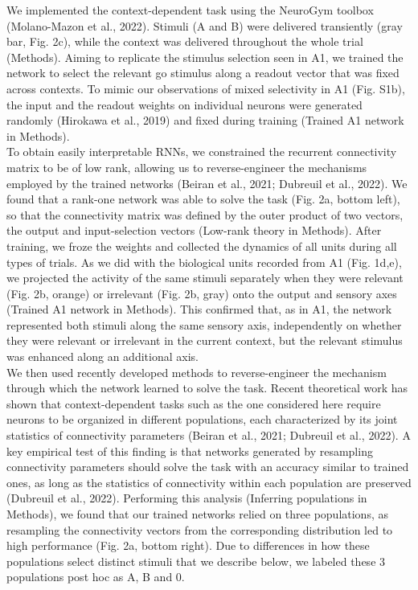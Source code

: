 \documentclass[12pt]{article}
\begin{document}
We implemented the context-dependent task using the NeuroGym toolbox (Molano-Mazon et al., 2022). Stimuli (A and B) were delivered transiently (gray bar, Fig. 2c), while the context was delivered throughout the whole trial (Methods). Aiming to replicate the stimulus selection seen in A1, we trained the network to select the relevant go stimulus along a readout vector that was fixed across contexts. To mimic our observations of mixed selectivity in A1 (Fig. S1b), the input and the readout weights on individual neurons were generated randomly (Hirokawa et al., 2019) and fixed during training (Trained  A1 network in Methods).  \\

To obtain easily interpretable RNNs, we constrained the recurrent connectivity matrix to be of low rank, allowing us to reverse-engineer the mechanisms employed by the trained networks (Beiran et al., 2021; Dubreuil et al., 2022). We found that a rank-one network was able to solve the task (Fig. 2a, bottom left), so that the connectivity matrix was defined by the outer product of two vectors, the output and input-selection vectors (Low-rank theory in Methods). After training, we froze the weights and collected the dynamics of all units during all types of trials. As we did with the biological units recorded from A1 (Fig. 1d,e), we projected the activity of the same stimuli separately when they were relevant (Fig. 2b, orange) or irrelevant (Fig. 2b, gray) onto the output and sensory axes (Trained  A1 network in Methods). This confirmed that, as in A1, the network represented both stimuli along the same sensory axis, independently on whether they were relevant or irrelevant in the current context, but the relevant stimulus was enhanced along an additional axis. \\

We then used recently developed methods to reverse-engineer the mechanism through which the network learned to solve the task. Recent theoretical work has shown that context-dependent tasks such as the one considered here require neurons to be organized in different populations, each characterized by its joint statistics of connectivity parameters (Beiran et al., 2021; Dubreuil et al., 2022). A key empirical test of this finding is that networks generated by resampling connectivity parameters should solve the task with an accuracy similar to trained ones, as long as the statistics of connectivity within each population are preserved (Dubreuil et al., 2022). Performing this analysis (Inferring populations in Methods), we found that our trained networks relied on three populations, as resampling the connectivity vectors from the corresponding distribution led to high performance (Fig. 2a, bottom right). Due to differences in how these populations select distinct stimuli that we describe below, we labeled these 3 populations post hoc as A, B and 0. \\
\end{document}
